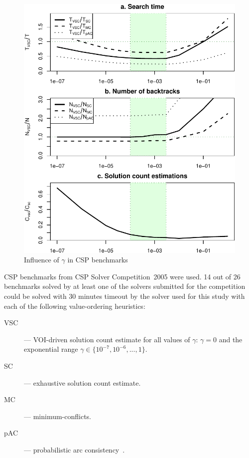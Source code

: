 \begin{figure}[h]
\centering
\includegraphics[scale=0.75]{csp-benchmarks.pdf}
\caption{Influence of $\gamma$ in CSP benchmarks}
\label{fig:benchmarks}
\end{figure}

CSP benchmarks from CSP Solver Competition~2005
\cite{Boussemart.benchmarks} were used. 14 out of 26 benchmarks
solved by at least one of the solvers submitted for the competition
could be solved with 30 minutes timeout by the solver used for this
study with each of the following value-ordering heuristics:
\begin{description}
\item[VSC] --- VOI-driven solution count estimate for all values of
$\gamma$: $\gamma=0$ and the exponential range $\gamma \in \{10^{-7}, 10^{-6}, ..., 1\}$.
\item[SC] --- exhaustive solution count estimate.
\item[MC] --- minimum-conflicts.
\item[pAC] --- probabilistic arc consistency~\cite{HorschHavens.pac}.
\end{description}

